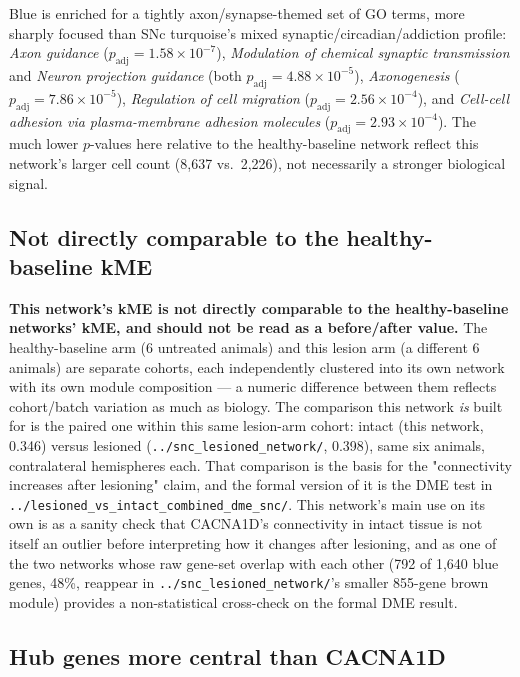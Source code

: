 \documentclass[11pt]{article}
\begin{document}
Blue is enriched for a tightly axon/synapse-themed set of GO terms, more
sharply focused than SNc turquoise's mixed synaptic/circadian/addiction
profile: \emph{Axon guidance} ($p_{\mathrm{adj}}=1.58\times10^{-7}$),
\emph{Modulation of chemical synaptic transmission} and \emph{Neuron
projection guidance} (both $p_{\mathrm{adj}}=4.88\times10^{-5}$),
\emph{Axonogenesis} ($p_{\mathrm{adj}}=7.86\times10^{-5}$), \emph{Regulation
of cell migration} ($p_{\mathrm{adj}}=2.56\times10^{-4}$), and
\emph{Cell-cell adhesion via plasma-membrane adhesion molecules}
($p_{\mathrm{adj}}=2.93\times10^{-4}$). The much lower $p$-values here
relative to the healthy-baseline network reflect this network's larger cell
count (8{,}637 vs.\ 2{,}226), not necessarily a stronger biological signal.

\subsection*{Not directly comparable to the healthy-baseline kME}

\textbf{This network's kME is not directly comparable to the
healthy-baseline networks' kME, and should not be read as a before/after
value.} The healthy-baseline arm (6 untreated animals) and this lesion arm
(a different 6 animals) are separate cohorts, each independently clustered
into its own network with its own module composition --- a numeric
difference between them reflects cohort/batch variation as much as
biology. The comparison this network \emph{is} built for is the paired one
within this same lesion-arm cohort: intact (this network, 0.346) versus
lesioned (\texttt{../snc\_lesioned\_network/}, 0.398), same six animals,
contralateral hemispheres each. That comparison is the basis for the
"connectivity increases after lesioning" claim, and the formal version of
it is the DME test in \texttt{../lesioned\_vs\_intact\_combined\_dme\_snc/}.
This network's main use on its own is as a sanity check that CACNA1D's
connectivity in intact tissue is not itself an outlier before interpreting
how it changes after lesioning, and as one of the two networks whose raw
gene-set overlap with each other (792 of 1{,}640 blue genes, 48\%, reappear
in \texttt{../snc\_lesioned\_network/}'s smaller 855-gene brown module)
provides a non-statistical cross-check on the formal DME result.

\subsection*{Hub genes more central than CACNA1D}
\end{document}
